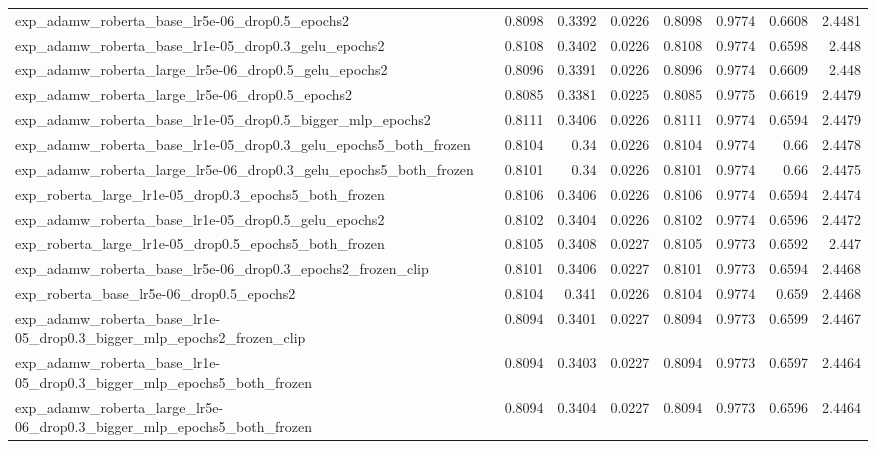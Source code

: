 \documentclass[a4paper,oneside,bibliography=totoc]{scrbook}
\begin{document}
\begin{landscape}
\begin{center}
\begin{longtable}{p{4cm} *{7}{r}}
        exp\_adamw\_roberta\_base\_lr5e-06\_drop0.5\_epochs2 & 0.8098 & 0.3392 & 0.0226 & 0.8098 & 0.9774 & 0.6608 & 2.4481 \\ 
        exp\_adamw\_roberta\_base\_lr1e-05\_drop0.3\_gelu\_epochs2 & 0.8108 & 0.3402 & 0.0226 & 0.8108 & 0.9774 & 0.6598 & 2.448 \\ 
        exp\_adamw\_roberta\_large\_lr5e-06\_drop0.5\_gelu\_epochs2 & 0.8096 & 0.3391 & 0.0226 & 0.8096 & 0.9774 & 0.6609 & 2.448 \\ 
        exp\_adamw\_roberta\_large\_lr5e-06\_drop0.5\_epochs2 & 0.8085 & 0.3381 & 0.0225 & 0.8085 & 0.9775 & 0.6619 & 2.4479 \\ 
        exp\_adamw\_roberta\_base\_lr1e-05\_drop0.5\_bigger\_mlp\_epochs2 & 0.8111 & 0.3406 & 0.0226 & 0.8111 & 0.9774 & 0.6594 & 2.4479 \\ 
        exp\_adamw\_roberta\_base\_lr1e-05\_drop0.3\_gelu\_epochs5\_both\_frozen & 0.8104 & 0.34 & 0.0226 & 0.8104 & 0.9774 & 0.66 & 2.4478 \\ 
        exp\_adamw\_roberta\_large\_lr5e-06\_drop0.3\_gelu\_epochs5\_both\_frozen & 0.8101 & 0.34 & 0.0226 & 0.8101 & 0.9774 & 0.66 & 2.4475 \\ 
        exp\_roberta\_large\_lr1e-05\_drop0.3\_epochs5\_both\_frozen & 0.8106 & 0.3406 & 0.0226 & 0.8106 & 0.9774 & 0.6594 & 2.4474 \\ 
        exp\_adamw\_roberta\_base\_lr1e-05\_drop0.5\_gelu\_epochs2 & 0.8102 & 0.3404 & 0.0226 & 0.8102 & 0.9774 & 0.6596 & 2.4472 \\ 
        exp\_roberta\_large\_lr1e-05\_drop0.5\_epochs5\_both\_frozen & 0.8105 & 0.3408 & 0.0227 & 0.8105 & 0.9773 & 0.6592 & 2.447 \\ 
        exp\_adamw\_roberta\_base\_lr5e-06\_drop0.3\_epochs2\_frozen\_clip & 0.8101 & 0.3406 & 0.0227 & 0.8101 & 0.9773 & 0.6594 & 2.4468 \\ 
        exp\_roberta\_base\_lr5e-06\_drop0.5\_epochs2 & 0.8104 & 0.341 & 0.0226 & 0.8104 & 0.9774 & 0.659 & 2.4468 \\ 
        exp\_adamw\_roberta\_base\_lr1e-05\_drop0.3\_bigger\_mlp\_epochs2\_frozen\_clip & 0.8094 & 0.3401 & 0.0227 & 0.8094 & 0.9773 & 0.6599 & 2.4467 \\ 
        exp\_adamw\_roberta\_base\_lr1e-05\_drop0.3\_bigger\_mlp\_epochs5\_both\_frozen & 0.8094 & 0.3403 & 0.0227 & 0.8094 & 0.9773 & 0.6597 & 2.4464 \\ 
        exp\_adamw\_roberta\_large\_lr5e-06\_drop0.3\_bigger\_mlp\_epochs5\_both\_frozen & 0.8094 & 0.3404 & 0.0227 & 0.8094 & 0.9773 & 0.6596 & 2.4464 \\ 

\end{longtable}
\end{center}
\end{landscape}
\end{document}
